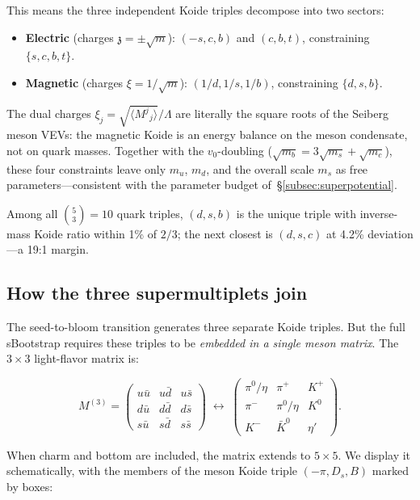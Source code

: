 \documentclass[12pt,a4paper]{article}
\newcommand{\zch}{\mathfrak{z}}
\begin{document}
This means the three independent Koide triples
decompose into two sectors:
\begin{itemize}
\item \textbf{Electric} (charges $\zch = \pm\sqrt{m}$):
$(-s,c,b)$ and $(c,b,t)$, constraining $\{s,c,b,t\}$.
\item \textbf{Magnetic} (charges $\xi = 1/\sqrt{m}$):
$(1/d,1/s,1/b)$, constraining $\{d,s,b\}$.
\end{itemize}
The dual charges $\xi_j = \sqrt{\langle M^j{}_j\rangle}/\Lambda$
are literally the square roots of the Seiberg meson VEVs:
the magnetic Koide is an energy balance on the meson
condensate, not on quark masses.
Together with the $v_0$-doubling
($\sqrt{m_b} = 3\sqrt{m_s} + \sqrt{m_c}$),
these four constraints leave only $m_u$, $m_d$, and
the overall scale $m_s$ as free parameters---consistent
with the parameter budget of~\S\ref{subsec:superpotential}.

Among all $\binom{5}{3} = 10$ quark triples, $(d,s,b)$ is the
unique triple with inverse-mass Koide ratio within 1\% of $2/3$;
the next closest is $(d,s,c)$ at 4.2\% deviation---a 19:1 margin.

\subsection{How the three supermultiplets join}

The seed-to-bloom transition generates three separate Koide triples. 
But the full sBootstrap requires these triples to be \emph{embedded 
in a single meson matrix}. The $3\times 3$ light-flavor matrix is:

\begin{equation}
M^{(3)} = \begin{pmatrix}
u\bar{u} & u\bar{d} & u\bar{s} \\
d\bar{u} & d\bar{d} & d\bar{s} \\
s\bar{u} & s\bar{d} & s\bar{s}
\end{pmatrix}
\;\longleftrightarrow\;
\begin{pmatrix}
\pi^0/\eta & \pi^+ & K^+ \\
\pi^- & \pi^0/\eta & K^0 \\
K^- & \bar{K}^0 & \eta'
\end{pmatrix}.
\end{equation}

When charm and bottom are included, the matrix extends to $5\times 5$. 
We display it schematically, with the members of the meson Koide 
triple $(-\pi, D_s, B)$ marked by boxes:
\end{document}
